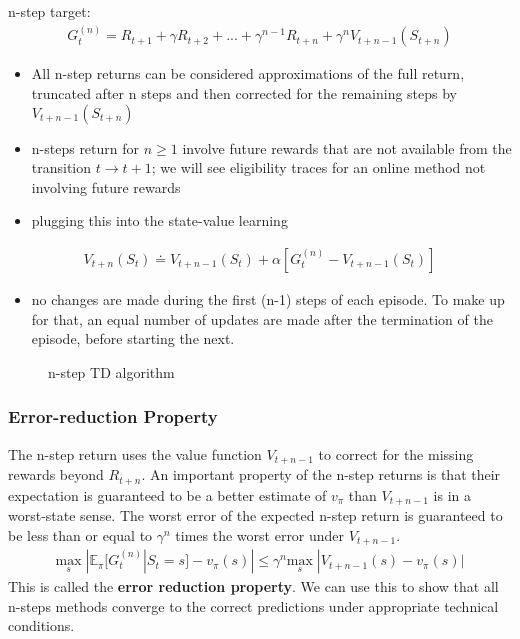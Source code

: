 \documentclass[sutton_barto_notes.tex]{subfiles}
\begin{document}
n-step target:
\begin{align}
G_t^{(n)} = R_{t+1} + \gamma R_{t+2} + ... + \gamma^{n-1} R_{t+n} + \gamma^n V_{t+n-1}(S_{t+n}) \label{eq:7.3}\tag{7.3}
\end{align}

\begin{itemize}
\item All n-step returns can be considered approximations of the full return, truncated after n steps and then corrected for the remaining steps by $V_{t+n-1}(S_{t+n})$
\item n-steps return for $n \geq 1$ involve future rewards that are not available from the transition $t \rightarrow t + 1$; we will see eligibility traces for an online method not involving future rewards
\item plugging this into the state-value learning
\end{itemize}
\begin{align}
V_{t+n}(S_t) \doteq V_{t+n-1}(S_t) + \alpha[G_t^{(n)} - V_{t+n-1}(S_t)] \label{eq:7.4}\tag{7.4}
\end{align}
\begin{itemize}
\item no changes are made during the first (n-1) steps of each episode. To make up for that, an equal number of updates are made after the termination of the episode, before starting the next.
\end{itemize}

\begin{figure}[h!]
    \centering
    \caption{ n-step TD algorithm }
\end{figure}

\subsubsection{Error-reduction Property}

The n-step return uses the value function $V_{t+n-1}$ to correct for the missing rewards beyond $R_{t+n}$. An important property of the n-step returns is that their expectation is guaranteed to be a better estimate of $v_\pi$ than $V_{t+n-1}$ is in a worst-state sense.
The worst error of the expected n-step return is guaranteed to be less than or equal to $\gamma^n$ times the worst error under $V_{t+n-1}$.
\begin{align}
\underset{s}{\mathrm{max}} \; | \mathbb{E}_{\pi} [G_t^{(n)} | S_t = s] - v_{\pi}(s) | \leq \gamma^n \underset{s}{\mathrm{max}} \; | V_{t+n-1}(s) - v_{\pi}(s)| \label{eq:7.5}\tag{7.5}
\end{align}
This is called the \textbf{error reduction property}. We can use this to show that all n-steps methods converge to the correct predictions under appropriate technical conditions.
\end{document}
